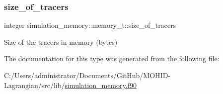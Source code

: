 \subsubsection{\texorpdfstring{size\+\_\+of\+\_\+tracers}{size\_of\_tracers}}
{\footnotesize\ttfamily integer simulation\+\_\+memory\+::memory\+\_\+t\+::size\+\_\+of\+\_\+tracers\hspace{0.3cm}{\ttfamily [private]}}



Size of the tracers in memory (bytes) 



The documentation for this type was generated from the following file\+:\begin{DoxyCompactItemize}
\item 
C\+:/\+Users/administrator/\+Documents/\+Git\+Hub/\+M\+O\+H\+I\+D-\/\+Lagrangian/src/lib/\hyperlink{simulation__memory_8f90}{simulation\+\_\+memory.\+f90}\end{DoxyCompactItemize}
